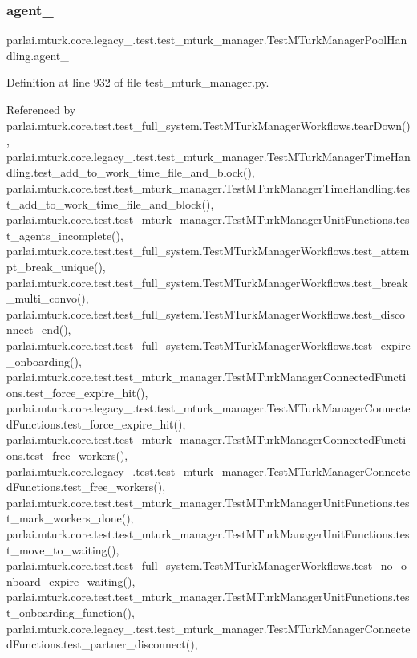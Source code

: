\subsubsection{\texorpdfstring{agent\+\_}{agent\_1}}
{\footnotesize\ttfamily parlai.\+mturk.\+core.\+legacy\+\_.\+test.\+test\+\_\+mturk\+\_\+manager.\+Test\+M\+Turk\+Manager\+Pool\+Handling.\+agent\+\_}



Definition at line 932 of file test\+\_\+mturk\+\_\+manager.\+py.



Referenced by parlai.\+mturk.\+core.\+test.\+test\+\_\+full\+\_\+system.\+Test\+M\+Turk\+Manager\+Workflows.\+tear\+Down(), parlai.\+mturk.\+core.\+legacy\+\_.\+test.\+test\+\_\+mturk\+\_\+manager.\+Test\+M\+Turk\+Manager\+Time\+Handling.\+test\+\_\+add\+\_\+to\+\_\+work\+\_\+time\+\_\+file\+\_\+and\+\_\+block(), parlai.\+mturk.\+core.\+test.\+test\+\_\+mturk\+\_\+manager.\+Test\+M\+Turk\+Manager\+Time\+Handling.\+test\+\_\+add\+\_\+to\+\_\+work\+\_\+time\+\_\+file\+\_\+and\+\_\+block(), parlai.\+mturk.\+core.\+test.\+test\+\_\+mturk\+\_\+manager.\+Test\+M\+Turk\+Manager\+Unit\+Functions.\+test\+\_\+agents\+\_\+incomplete(), parlai.\+mturk.\+core.\+test.\+test\+\_\+full\+\_\+system.\+Test\+M\+Turk\+Manager\+Workflows.\+test\+\_\+attempt\+\_\+break\+\_\+unique(), parlai.\+mturk.\+core.\+test.\+test\+\_\+full\+\_\+system.\+Test\+M\+Turk\+Manager\+Workflows.\+test\+\_\+break\+\_\+multi\+\_\+convo(), parlai.\+mturk.\+core.\+test.\+test\+\_\+full\+\_\+system.\+Test\+M\+Turk\+Manager\+Workflows.\+test\+\_\+disconnect\+\_\+end(), parlai.\+mturk.\+core.\+test.\+test\+\_\+full\+\_\+system.\+Test\+M\+Turk\+Manager\+Workflows.\+test\+\_\+expire\+\_\+onboarding(), parlai.\+mturk.\+core.\+test.\+test\+\_\+mturk\+\_\+manager.\+Test\+M\+Turk\+Manager\+Connected\+Functions.\+test\+\_\+force\+\_\+expire\+\_\+hit(), parlai.\+mturk.\+core.\+legacy\+\_.\+test.\+test\+\_\+mturk\+\_\+manager.\+Test\+M\+Turk\+Manager\+Connected\+Functions.\+test\+\_\+force\+\_\+expire\+\_\+hit(), parlai.\+mturk.\+core.\+test.\+test\+\_\+mturk\+\_\+manager.\+Test\+M\+Turk\+Manager\+Connected\+Functions.\+test\+\_\+free\+\_\+workers(), parlai.\+mturk.\+core.\+legacy\+\_.\+test.\+test\+\_\+mturk\+\_\+manager.\+Test\+M\+Turk\+Manager\+Connected\+Functions.\+test\+\_\+free\+\_\+workers(), parlai.\+mturk.\+core.\+test.\+test\+\_\+mturk\+\_\+manager.\+Test\+M\+Turk\+Manager\+Unit\+Functions.\+test\+\_\+mark\+\_\+workers\+\_\+done(), parlai.\+mturk.\+core.\+test.\+test\+\_\+mturk\+\_\+manager.\+Test\+M\+Turk\+Manager\+Unit\+Functions.\+test\+\_\+move\+\_\+to\+\_\+waiting(), parlai.\+mturk.\+core.\+test.\+test\+\_\+full\+\_\+system.\+Test\+M\+Turk\+Manager\+Workflows.\+test\+\_\+no\+\_\+onboard\+\_\+expire\+\_\+waiting(), parlai.\+mturk.\+core.\+test.\+test\+\_\+mturk\+\_\+manager.\+Test\+M\+Turk\+Manager\+Unit\+Functions.\+test\+\_\+onboarding\+\_\+function(), parlai.\+mturk.\+core.\+legacy\+\_.\+test.\+test\+\_\+mturk\+\_\+manager.\+Test\+M\+Turk\+Manager\+Connected\+Functions.\+test\+\_\+partner\+\_\+disconnect(), 